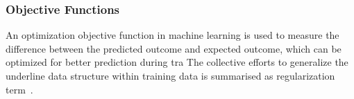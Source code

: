 \subsubsection{Objective Functions}
An optimization objective function in machine learning is used to measure the difference between the predicted outcome and expected outcome, which can be optimized for better prediction during tra The collective efforts to generalize the underline data structure within training data is summarised as regularization term~\cite{goodfellow_2015}.  